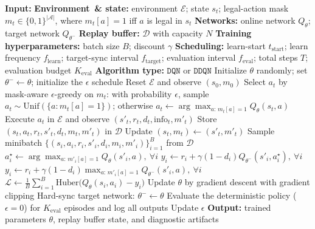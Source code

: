 \begin{algorithm}[!tbp]
\caption{Mask-aware DQN/DDQN training with legal-action masking.}
\label{alg:mask_aware_training}
\begin{algorithmic}[1]
\STATE \textbf{Input:}
\STATE \hspace*{1em} \textbf{Environment \,\& state:} environment $\mathcal{E}$; state $s_t$; legal-action mask $m_t \in \{0,1\}^{|\mathcal{A}|}$, where $m_t[a]=1$ iff $a$ is legal in $s_t$
\STATE \hspace*{1em} \textbf{Networks:} online network $Q_{\theta}$; target network $Q_{\theta^-}$
\STATE \hspace*{1em} \textbf{Replay buffer:} $\mathcal{D}$ with capacity $N$
\STATE \hspace*{1em} \textbf{Training hyperparameters:} batch size $B$; discount $\gamma$
\STATE \hspace*{1em} \textbf{Scheduling:} learn-start $t_{\mathrm{start}}$; learn frequency $f_{\mathrm{learn}}$; target-sync interval $f_{\mathrm{target}}$; evaluation interval $f_{\mathrm{eval}}$; total steps $T$; evaluation budget $K_{\mathrm{eval}}$
\STATE \hspace*{1em} \textbf{Algorithm type:} $\texttt{DQN}$ or $\texttt{DDQN}$
\STATE Initialize $\theta$ randomly; set $\theta^- \leftarrow \theta$; initialize the $\epsilon$ schedule
\STATE Reset $\mathcal{E}$ and observe $(s_0,m_0)$
    \STATE Select $a_t$ by mask-aware $\epsilon$-greedy on $m_t$: with probability $\epsilon$, sample $a_t \sim \mathrm{Unif}(\{a:m_t[a]=1\})$; otherwise $a_t \leftarrow \arg\max_{a:\,m_t[a]=1} Q_{\theta}(s_t,a)$
    \STATE Execute $a_t$ in $\mathcal{E}$ and observe $(s'_{t},r_t,d_t,\mathrm{info}_t,m'_{t})$
    \STATE Store $(s_t,a_t,r_t,s'_{t},d_t,m_t,m'_{t})$ in $\mathcal{D}$
    \STATE Update $(s_t,m_t) \leftarrow (s'_{t},m'_{t})$
        \STATE Sample minibatch $\{(s_i,a_i,r_i,s'_i,d_i,m_i,m'_i)\}_{i=1}^{B}$ from $\mathcal{D}$
            \STATE $a_i^{\star} \leftarrow \arg\max_{a:\,m'_i[a]=1} Q_{\theta}(s'_i,a),\ \forall i$
            \STATE $y_i \leftarrow r_i + \gamma(1-d_i)Q_{\theta^-}(s'_i,a_i^{\star}),\ \forall i$
        \ELSE
            \STATE $y_i \leftarrow r_i + \gamma(1-d_i)\max_{a:\,m'_i[a]=1} Q_{\theta^-}(s'_i,a),\ \forall i$
        \ENDIF
        \STATE $\mathcal{L} \leftarrow \frac{1}{B}\sum_{i=1}^{B}\mathrm{Huber}\big(Q_{\theta}(s_i,a_i)-y_i\big)$
        \STATE Update $\theta$ by gradient descent with gradient clipping
    \ENDIF
        \STATE Hard-sync target network: $\theta^- \leftarrow \theta$
    \ENDIF
        \STATE Evaluate the deterministic policy ($\epsilon=0$) for $K_{\mathrm{eval}}$ episodes and log all outputs
    \ENDIF
    \STATE Update $\epsilon$
\ENDFOR
\STATE \textbf{Output:} trained parameters $\theta$, replay buffer state, and diagnostic artifacts
\end{algorithmic}
\end{algorithm}
